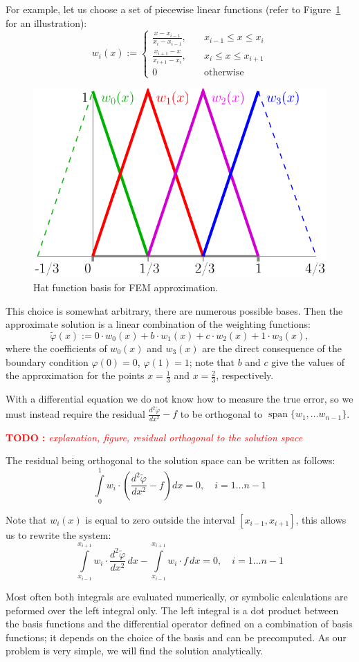 \documentclass[notitlepage]{report}
\DeclareMathOperator{\Span}{span}
\newcommand\TODO[1]{\textcolor{red}{{\bf TODO :} \it #1}}
\begin{document}
For example, let us choose a set of piecewise linear functions (refer to Figure~\ref{fig:fem:blending} for an illustration):
$$
w_i(x) := \left\{
\begin{split}
\frac{x-x_{i-1}}{x_i-x_{i-1}}, & \quad x_{i-1}\leq x \leq x_i \\
\frac{x_{i+1}-x}{x_{i+1}-x_i}, & \quad x_i\leq x \leq x_{i+1}\\
0 & \quad \text{otherwise}
\end{split}
\right.
$$

\begin{figure}[ht]
	\centering
	\includegraphics[width=.3\linewidth]{blending_functions.pdf}
	\caption{Hat function basis for FEM approximation.}
	\label{fig:fem:blending}
\end{figure}

This choice is somewhat arbitrary, there are numerous possible bases.
Then the approximate solution is a linear combination of the weighting functions:
$$
\tilde{\varphi}(x) := 0\cdot w_0(x) + b\cdot w_1(x) + c\cdot w_2(x) + 1\cdot w_3(x),
$$
where the coefficients of $w_0(x)$ and $w_3(x)$ are the direct consequence of the boundary condition $\varphi(0)=0$, $\varphi(1)=1$;
note that $b$ and $c$ give the values of the approximation for the points $x=\frac{1}{3}$ and $x=\frac{2}{3}$, respectively.

With a differential equation we do not know how to measure the true error, 
so we must instead require the residual $\frac{d^2\tilde{\varphi}}{dx^2} - f$ to be orthogonal to $\Span\{w_1,\dots w_{n-1}\}$.

\TODO{explanation, figure, residual orthogonal to the solution space}


The residual being orthogonal to the solution space can be written as follows:
$$
\int\limits_0^1 w_i \cdot \left(\frac{d^2\tilde{\varphi}}{dx^2} - f\right) dx = 0, \quad i = 1\dots n-1 
$$

Note that $w_i(x)$ is equal to zero outside the interval $[x_{i-1}, x_{i+1}]$, this allows us to rewrite the system:
$$
\int\limits_{x_{i-1}}^{x_{i+1}} w_i \cdot \frac{d^2\tilde{\varphi}}{dx^2}\,dx - \int\limits_{x_{i-1}}^{x_{i+1}} w_i\cdot f\,dx = 0, \quad i = 1\dots n-1
$$

Most often both integrals are evaluated numerically, or symbolic calculations are peformed over the left integral only.
The left integral is a dot product between the basis functions and the differential operator defined on a combination of basis functions;
it depends on the choice of the basis and can be precomputed.
As our problem is very simple, we will find the solution analytically.
\end{document}
